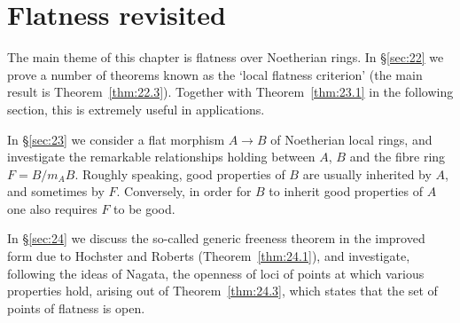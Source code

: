 \chapter{Flatness revisited}\label{ch:8}

The main theme of this chapter is flatness over Noetherian rings. In
\S\ref{sec:22} we prove a number of theorems known as the `local flatness criterion'
(the main result is Theorem~\ref{thm:22.3}). Together with Theorem~\ref{thm:23.1} in the
following section, this is extremely useful in applications.

In \S\ref{sec:23} we consider a flat morphism $A \to B$ of Noetherian local rings, and
investigate the remarkable relationships holding between $A$, $B$ and the fibre
ring $F = B/m_AB$. Roughly speaking, good properties of $B$ are usually inherited
by $A$, and sometimes by $F$. Conversely, in order for $B$ to inherit good
properties of $A$ one also requires $F$ to be good.

In \S\ref{sec:24} we discuss the so-called generic freeness theorem in the
improved form due to Hochster and Roberts (Theorem~\ref{thm:24.1}), and
investigate, following the ideas of Nagata, the openness of loci of points at
which various properties hold, arising out of Theorem~\ref{thm:24.3}, which states
that the set of points of flatness is open.




